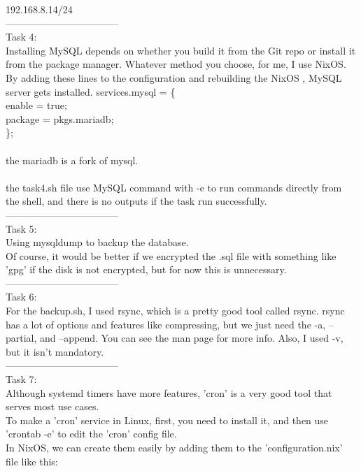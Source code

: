 \documentclass[a4paper,14pt]{extarticle}
\begin{document}
192.168.8.14/24\\
-----------------------------------\\
\newpage
Task 4:\\
Installing MySQL depends on whether you build it from the Git repo or install it from the package manager. Whatever method you choose, for me, I use
NixOS. By adding these lines to the configuration and rebuilding the NixOS , MySQL server gets installed.
services.mysql = \{\\
  enable = true;\\
  package = pkgs.mariadb;\\
\};\\
\\
the mariadb is a fork of mysql.\\
\\
the task4.sh file use MySQL command with -e to run commands directly from the shell, and there is no outputs if the task run successfully.\\
-----------------------------------\\
Task 5:\\
Using mysqldump to backup the database.\\
Of course, it would be better if we encrypted the .sql file with something like 'gpg' if the disk is not encrypted, but for now this is unnecessary.\\
-----------------------------------\\
Task 6:\\
For the backup.sh, I used rsync, which is a pretty good tool called rsync. rsync has a lot of options and features like compressing, but we just need the -a, --partial, and --append. You can see the man page for more info. Also, I used -v, but it isn't mandatory.\\
-----------------------------------\\
Task 7:\\
Although systemd timers have more features, 'cron' is a very good tool that serves most use cases.\\
To make a 'cron' service in Linux, first, you need to install it, and then use 'crontab -e' to edit the 'cron' config file.\\
In NixOS, we can create them easily by adding them to the 'configuration.nix' file like this:\\
\end{document}
